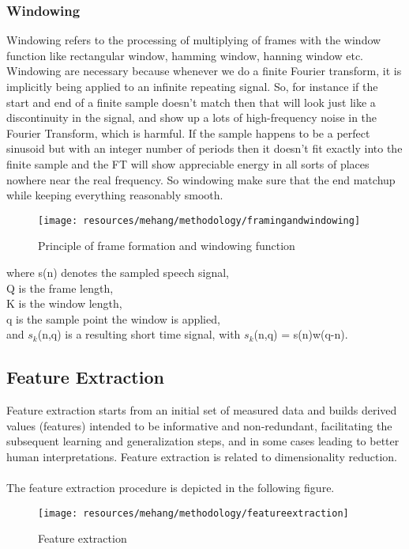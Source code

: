 \subsubsection{Windowing}
Windowing refers to the processing of multiplying of frames with the window function like rectangular window, hamming window, hanning window etc. Windowing are necessary because whenever we do a finite Fourier transform, it is implicitly being applied to an infinite repeating signal. So, for instance if the start and end of a finite sample doesn’t match then that will look just like a discontinuity in the signal, and show up a lots of high-frequency noise in the Fourier Transform, which is harmful. If the sample happens to be a perfect sinusoid but with an integer number of periods then it doesn’t fit exactly into the finite sample and the FT will show appreciable energy in all sorts of places nowhere near the real frequency. So windowing make sure that the end matchup while keeping everything reasonably smooth.
\begin{figure}[h!]
        \centering
        \texttt{[image: resources/mehang/methodology/framingandwindowing]}
        \caption{Principle of frame formation and windowing function}
\end{figure}
where s(n) denotes the sampled speech signal,\\
Q is the frame length,\\
K is the window length,\\
q is the sample point the window is applied,\\
and $s_k$(n,q) is a resulting short time signal, with $s_k$(n,q) = s(n)w(q-n).

\subsection{Feature Extraction}
Feature extraction starts from an initial set of measured data and builds derived values (features) intended to be informative and non-redundant, facilitating the subsequent learning and generalization steps, and in some cases leading to better human interpretations. Feature extraction is related to dimensionality reduction.\\
\\
The feature extraction procedure is depicted in the following figure.
\begin{figure}[h!]
        \centering
        \texttt{[image: resources/mehang/methodology/featureextraction]}
        \caption{Feature extraction}
\end{figure}


